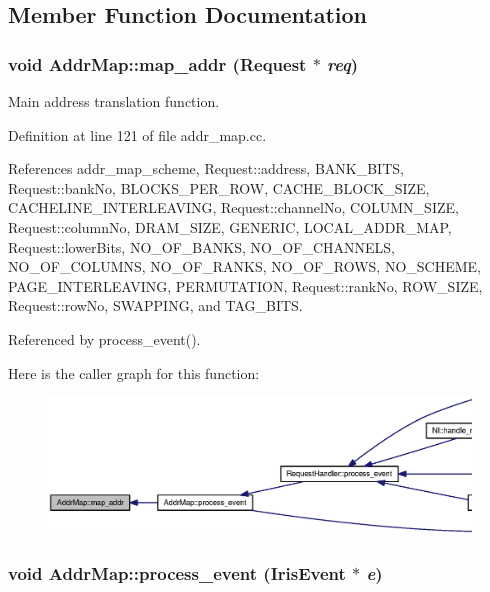 \subsection{Member Function Documentation}
\subsubsection[{map\_\-addr}]{\setlength{\rightskip}{0pt plus 5cm}void AddrMap::map\_\-addr ({\bf Request} $\ast$ {\em req})}\label{classAddrMap_0da8ea664e351b258473e04935d7170a}


Main address translation function. 



Definition at line 121 of file addr\_\-map.cc.

References addr\_\-map\_\-scheme, Request::address, BANK\_\-BITS, Request::bankNo, BLOCKS\_\-PER\_\-ROW, CACHE\_\-BLOCK\_\-SIZE, CACHELINE\_\-INTERLEAVING, Request::channelNo, COLUMN\_\-SIZE, Request::columnNo, DRAM\_\-SIZE, GENERIC, LOCAL\_\-ADDR\_\-MAP, Request::lowerBits, NO\_\-OF\_\-BANKS, NO\_\-OF\_\-CHANNELS, NO\_\-OF\_\-COLUMNS, NO\_\-OF\_\-RANKS, NO\_\-OF\_\-ROWS, NO\_\-SCHEME, PAGE\_\-INTERLEAVING, PERMUTATION, Request::rankNo, ROW\_\-SIZE, Request::rowNo, SWAPPING, and TAG\_\-BITS.

Referenced by process\_\-event().

Here is the caller graph for this function:\nopagebreak
\begin{figure}[H]
\begin{center}
\leavevmode
\includegraphics[width=420pt]{classAddrMap_0da8ea664e351b258473e04935d7170a_icgraph}
\end{center}
\end{figure}
\subsubsection[{process\_\-event}]{\setlength{\rightskip}{0pt plus 5cm}void AddrMap::process\_\-event ({\bf IrisEvent} $\ast$ {\em e})}\label{classAddrMap_e3ac527bcffced20f090db49c4047b60}


